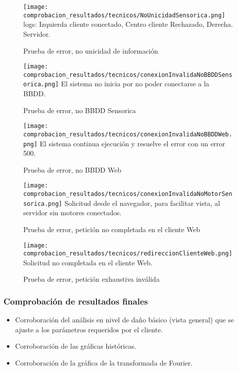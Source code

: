 	\begin{figure}[htb]
		\centering
        \caption{Prueba de error, no unicidad de información}
        \texttt{[image: comprobacion\_resultados/tecnicos/NoUnicidadSensorica.png]}
        logs: Izquierda cliente conectado, Centro cliente Rechazado, Derecha.
        Servidor.
        \label{img:NoUnicidad}
	\end{figure}

    \begin{figure}[htb]
		\centering
        \caption{Prueba de error, no BBDD Sensorica}
        \texttt{[image: comprobacion\_resultados/tecnicos/conexionInvalidaNoBBDDSensorica.png]}
        El sistema no inicia por no poder conectarse a la BBDD.
        \label{img:NoBBDDSensorica}
	\end{figure}

    \begin{figure}[htb]
		\centering
        \caption{Prueba de error, no BBDD Web}
        \texttt{[image: comprobacion\_resultados/tecnicos/conexionInvalidaNoBBDDWeb.png]}
        El sistema continua ejecución y resuelve el error con un error 500.
        \label{img:NoBBDDWeb}
	\end{figure}

    \begin{figure}[htb]
		\centering
        \caption{Prueba de error, petición no completada en el cliente Web}
        \texttt{[image: comprobacion\_resultados/tecnicos/conexionInvalidaNoMotorSensorica.png]}
        Solicitud  desde el navegador, para facilitar vista, al servidor
        sin motores conectados.
        \label{img:ErrorExhaustiva}
	\end{figure}

    \begin{figure}[htb]
		\centering
        \caption{Prueba de error, petición exhaustiva inválida}
        \texttt{[image: comprobacion\_resultados/tecnicos/redireccionClienteWeb.png]}
        Solicitud no completada en el cliente Web. \label{imga:SolicitudNoCompletada}
	\end{figure}

\subsubsection{Comprobación de resultados finales}
\begin{itemize}
    \item Corroboración del análisis en nivel de daño básico (vista general)
        que se ajuste a los parámetros requeridos por el cliente.
    \item Corroboración de las gráficas históricas.
    \item Corroboración de la gráfica de la transformada de Fourier.
\end{itemize}


